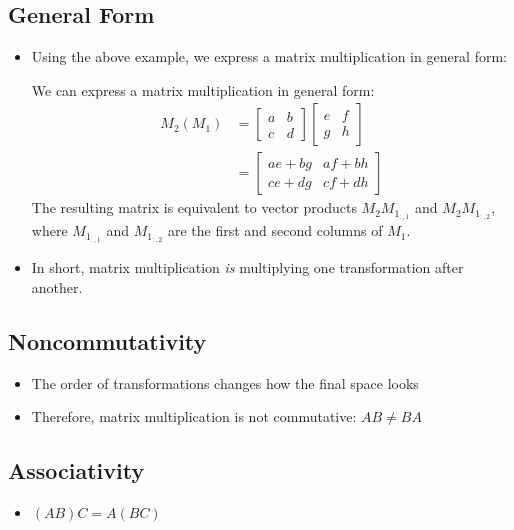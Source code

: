 \subsection{General Form}
\begin{itemize}
    \item Using the above example, we express a matrix multiplication in general form:
    \begin{example}
        We can express a matrix multiplication in general form:
        \begin{align}
            M_2(M_1) &= \begin{bmatrix}
                a & b \\
                c & d
            \end{bmatrix}
            \begin{bmatrix}
                e & f \\
                g & h 
            \end{bmatrix} \\
            &= \begin{bmatrix}
                ae + bg & af + bh \\
                ce + dg & cf + dh
            \end{bmatrix}
        \end{align}
    The resulting matrix is equivalent to vector products $M_2 M_{1_{:, 1}}$ and $M_2 M_{1_{:, 2}}$, where $M_{1_{:, 1}}$ and $M_{1_{:, 2}}$ are the first and second columns of $M_1$.
    \end{example}
    \item In short, matrix multiplication \textit{is} multiplying one transformation after another.
\end{itemize}

\subsection{Noncommutativity}
\begin{itemize}
    \item The order of transformations changes how the final space looks
    \item Therefore, matrix multiplication is not commutative: $AB \neq BA$
\end{itemize}

\subsection{Associativity}
\begin{itemize}
    \item $(AB)C = A(BC)$
\end{itemize}